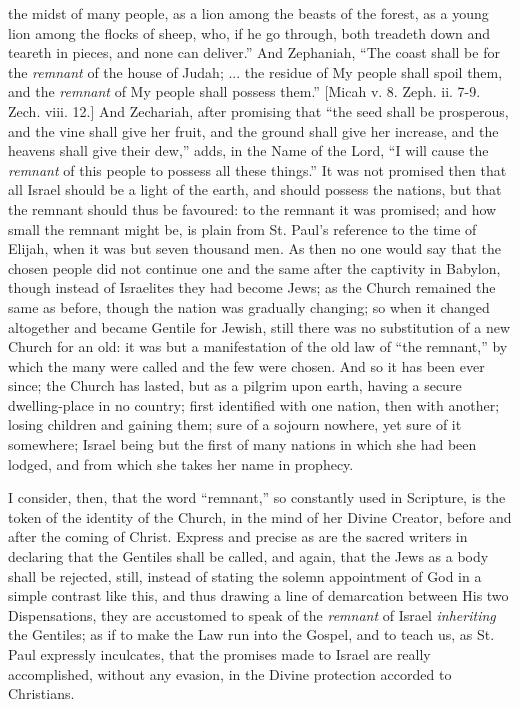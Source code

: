 the midst of many people, as a lion among the beasts of the forest, as
a young lion among the flocks of sheep, who, if he go through, both
treadeth down and teareth in pieces, and none can deliver.'' And
Zephaniah, ``The coast shall be for the \emph{remnant} of the
house of Judah; ... the residue of My people shall spoil them, and the
\emph{remnant} of My people shall possess them.'' [Micah v. 8.
Zeph. ii. 7-9. Zech. viii. 12.] And Zechariah, after promising that
``the seed shall be prosperous, and the vine shall give her fruit,
and the ground shall give her increase, and the heavens shall give
their dew,'' adds, in the Name of the Lord, ``I will cause the
\emph{remnant} of this people to possess all these things.'' It
was not promised then that all Israel should be a light of the earth,
and should possess the nations, but that the remnant should thus be
favoured: to the remnant it was promised; and how small the remnant
might be, is plain from St. Paul's reference to the time of Elijah,
when it was but seven thousand men. As then no one would say that the
chosen people did not continue one and the same after the captivity in
Babylon, though instead of Israelites they had become Jews; as the
Church remained the same as before, though the nation was gradually
changing; so when it changed altogether and became Gentile for Jewish,
still there was no substitution of a new Church for an old: it was but
a manifestation of the old law of ``the remnant,'' by which
the many were called and the few were chosen. And so it has been ever
since; the Church has lasted, but as a pilgrim upon earth, having a
secure dwelling-place in no country; first identified with one nation,
then with another; losing children and gaining them; sure of a sojourn
nowhere, yet sure of it somewhere; Israel being but the first of many
nations in which she had been lodged, and from which she takes her
name in prophecy.

I consider, then, that the word ``remnant,'' so constantly
used in Scripture, is the token of the identity of the Church, in the
mind of her Divine Creator, before and after the coming of Christ.
Express and precise as are the sacred writers in declaring that the
Gentiles shall be called, and again, that the Jews as a body shall be
rejected, still, instead of stating the solemn appointment of God in a
simple contrast like this, and thus drawing a line of demarcation
between His two Dispensations, they are accustomed to speak of the \emph{remnant}
of Israel \emph{inheriting} the Gentiles; as if to make the Law run
into the Gospel, and to teach us, as St. Paul expressly inculcates,
that the promises made to Israel are really accomplished, without any
evasion, in the Divine protection accorded to Christians.

